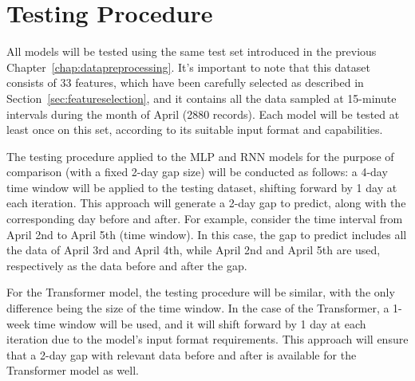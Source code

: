 \section{Testing Procedure}
All models will be tested using the same test set  introduced in the previous Chapter~\ref{chap:datapreprocessing}. It's important to note that this dataset consists of 33 features, which have been carefully selected as described in Section~\ref{sec:featureselection}, and it contains all the data sampled at 15-minute intervals during the month of April (2880 records). Each model will be tested at least once on this set, according to its suitable input format and capabilities.


The testing procedure applied to the MLP and RNN models for the purpose of comparison (with a fixed 2-day gap size) will be conducted as follows: a 4-day time window will be applied to the testing dataset, shifting forward by 1 day at each iteration. This approach will generate a 2-day gap to predict, along with the corresponding day before and after. For example, consider the time interval from April 2nd to April 5th (time window). In this case, the gap to predict includes all the data of April 3rd and April 4th, while April 2nd and April 5th are used, respectively as the data before and after the gap.

For the Transformer model, the testing procedure will be similar, with the only difference being the size of the time window. In the case of the Transformer, a 1-week time window will be used, and it will shift forward by 1 day at each iteration due to the model's input format requirements. This approach will ensure that a 2-day gap with relevant data before and after is available for the Transformer model as well.

